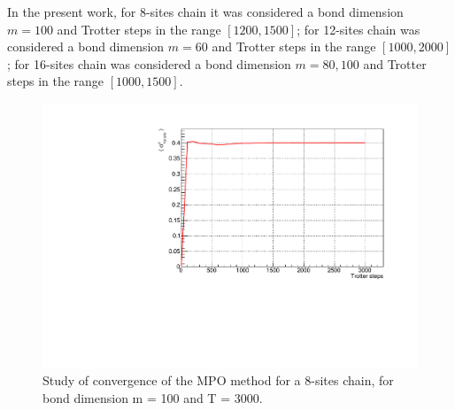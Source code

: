 In the present work, for 8-sites chain it was considered a bond dimension $m = 100$ and Trotter steps in the range $[1200, 1500]$; for 12-sites chain was considered a bond dimension $m = 60$ and Trotter steps in the range $[1000, 2000]$; for 16-sites chain was considered a bond dimension $m = 80, 100$ and Trotter steps in the range $[1000, 1500]$.

\begin{figure}[H]
    \label{fig:convergence_mpo_8sites}
    \centering
    \includegraphics[scale=0.7]{Figures/convergence/Convergence_s8T3000J1051.pdf}
    \caption{Study of convergence of the MPO method for a 8-sites chain, for bond dimension m = 100 and T = 3000.}
    \label{fig:convergenceMPO_8sites}
\end{figure}